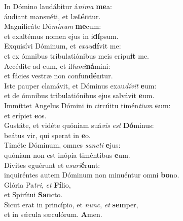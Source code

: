 \evenverse In Dómino laudábitur á\textit{ni}\textit{ma} \textbf{me}a:~\*\\
\evenverse áudiant mansuéti, et læ\textbf{tén}tur.\\
\oddverse Magnificáte Dó\textit{mi}\textit{num} \textbf{me}cum:~\*\\
\oddverse et exaltémus nomen ejus in i\textbf{dí}psum.\\
\evenverse Exquisívi Dóminum, et \textit{e}\textit{xau}\textbf{dí}vit me:~\*\\
\evenverse et ex ómnibus tribulatiónibus meis erípu\textbf{it} me.\\
\oddverse Accédite ad eum, et il\textit{lu}\textit{mi}\textbf{ná}mini:~\*\\
\oddverse et fácies vestræ non confun\textbf{dén}tur.\\
\evenverse Iste pauper clamávit, et Dóminus exau\textit{dí}\textit{vit} \textbf{e}um:~\*\\
\evenverse et de ómnibus tribulatiónibus ejus salvávit \textbf{e}um.\\
\oddverse Immíttet Angelus Dómini in circúitu timén\textit{ti}\textit{um} \textbf{e}um:~\*\\
\oddverse et erípiet \textbf{e}os.\\
\evenverse Gustáte, et vidéte quóniam suá\textit{vis} \textit{est} \textbf{Dó}minus:~\*\\
\evenverse beátus vir, qui sperat in \textbf{e}o.\\
\oddverse Timéte Dóminum, omnes \textit{san}\textit{cti} \textbf{e}jus:~\*\\
\oddverse quóniam non est inópia timéntibus \textbf{e}um.\\
\evenverse Dívites eguérunt et e\textit{su}\textit{ri}\textbf{é}runt:~\*\\
\evenverse inquiréntes autem Dóminum non minuéntur omni \textbf{bo}no.\\
\oddverse Glória Pa\textit{tri}, \textit{et} \textbf{Fí}lio,~\*\\
\oddverse et Spirítui \textbf{San}cto.\\
\evenverse Sicut erat in princípio, et \textit{nunc}, \textit{et} \textbf{sem}per,~\*\\
\evenverse et in sǽcula sæculórum. \textbf{A}men.\\
